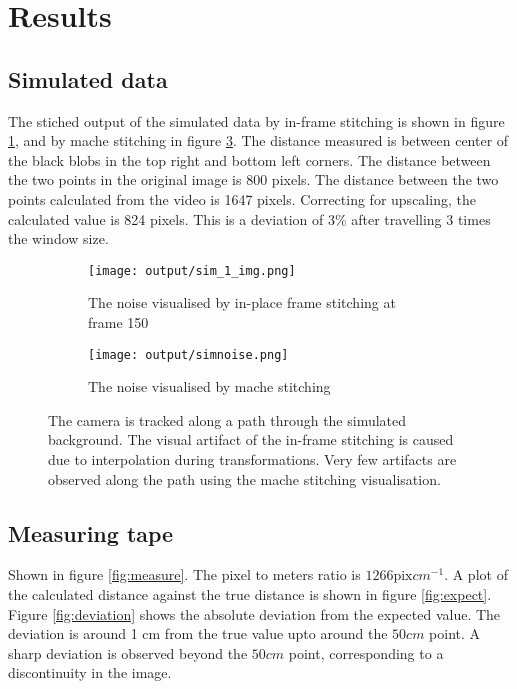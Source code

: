 \section{Results}

\subsection{Simulated data}

The stiched output of the simulated data by in-frame stitching is shown in figure \ref{fig:simnoise_a},
and by mache stitching in figure \ref{fig:simnoise}.
The distance measured is between center of the black blobs in the top right and bottom left corners.
The distance between the two points in the original image is 800 pixels.
The distance between the two points calculated from the video is 1647 pixels.
Correcting for upscaling, the calculated value is 824 pixels.
This is a deviation of 3\% after travelling 3 times the window size.

\begin{figure}
  \begin{subfigure}[b]{0.45\textwidth}
    \texttt{[image: output/sim\_1\_img.png]}
    \caption{The noise visualised by in-place frame stitching at frame 150}
    \label{fig:simnoise_a}
  \end{subfigure}
  \begin{subfigure}[b]{0.45\textwidth}
    \texttt{[image: output/simnoise.png]}
    \caption{The noise visualised by mache stitching}
    \label{fig:simnoise}
  \end{subfigure}
  \caption{The camera is tracked along a path through the simulated background.
  The visual artifact of the in-frame stitching is caused due to interpolation during transformations.
  Very few artifacts are observed along the path using the mache stitching visualisation.}
\end{figure}

\subsection{Measuring tape}

Shown in figure \ref{fig:measure}.
The pixel to meters ratio is $1266 \text{pix} cm^{-1}$.
A plot of the calculated distance against the true distance is shown in figure \ref{fig:expect}.
Figure \ref{fig:deviation} shows the absolute deviation from the expected value.
The deviation is around 1 cm from the true value upto around the $50 cm$ point.
A sharp deviation is observed beyond the $50 cm$ point,
corresponding to a discontinuity in the image.

